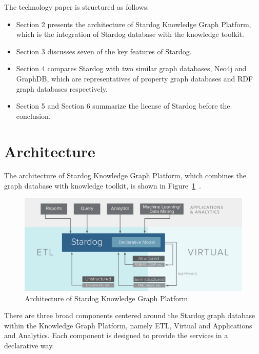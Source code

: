 The technology paper is structured as follows:
\begin{itemize}
	\item Section 2 presents the architecture of Stardog Knowledge Graph 
	Platform, which is the integration of Stardog database with the knowledge 
	toolkit.
	\item Section 3 discusses seven of the key features of Stardog.
	\item Section 4 compares Stardog with two similar graph databases, Neo4j 
	and GraphDB, which are representatives of property graph databases and 
	RDF graph databases respectively.
	\item Section 5 and Section 6 summarize the license of Stardog before the 
	conclusion.
\end{itemize}

\section{Architecture}
The architecture of Stardog Knowledge Graph Platform, which combines the 
graph database with knowledge toolkit, is shown in 
Figure~\ref{sa:archi}~\cite{hid-sp18-405-blog-stardog-kgraph}.
\begin{figure}[!ht]
  \centering\includegraphics[width=\columnwidth]{../images/stardog-architecture.png}
  \caption{Architecture of Stardog Knowledge Graph Platform}\label{sa:archi}
\end{figure}
There are three broad components centered around the Stardog graph 
database within the Knowledge Graph Platform, namely ETL, Virtual and 
Applications and Analytics. Each component is designed to provide 
the services in a declarative way. 
